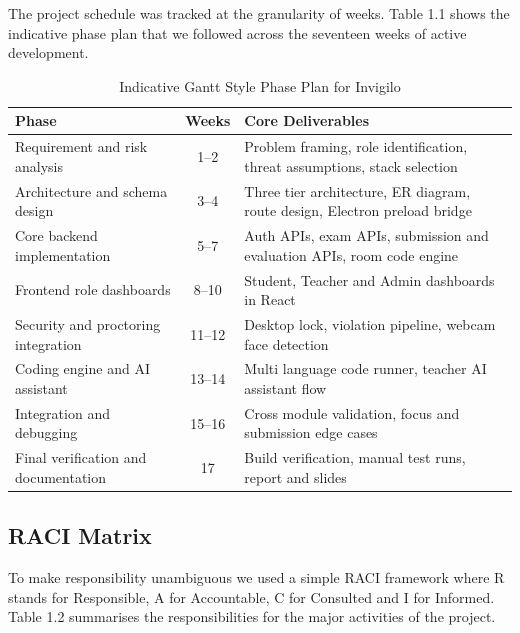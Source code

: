 \documentclass[12pt, a4paper]{report}
\begin{document}
\begin{justify}
  {\fontsize{12}{18}\selectfont
    The project schedule was tracked at the granularity of weeks. Table 1.1 shows the indicative phase plan that we followed across the seventeen weeks of active development.
  }
\end{justify}

\begin{table}[H]
  \caption{Indicative Gantt Style Phase Plan for Invigilo}
  \label{tab:1.1}
  \centering
  {\fontsize{11}{14}\selectfont
    \begin{tabular}{|p{1.2in}|c|p{3in}|}
      \hline
      \textbf{Phase} & \textbf{Weeks} & \textbf{Core Deliverables} \\
      \hline
      Requirement and risk analysis & 1--2 & Problem framing, role identification, threat assumptions, stack selection \\
      \hline
      Architecture and schema design & 3--4 & Three tier architecture, ER diagram, route design, Electron preload bridge \\
      \hline
      Core backend implementation & 5--7 & Auth APIs, exam APIs, submission and evaluation APIs, room code engine \\
      \hline
      Frontend role dashboards & 8--10 & Student, Teacher and Admin dashboards in React \\
      \hline
      Security and proctoring integration & 11--12 & Desktop lock, violation pipeline, webcam face detection \\
      \hline
      Coding engine and AI assistant & 13--14 & Multi language code runner, teacher AI assistant flow \\
      \hline
      Integration and debugging & 15--16 & Cross module validation, focus and submission edge cases \\
      \hline
      Final verification and documentation & 17 & Build verification, manual test runs, report and slides \\
      \hline
    \end{tabular}
  }
\end{table}

\subsection{RACI Matrix}

\begin{justify}
  {\fontsize{12}{18}\selectfont
    To make responsibility unambiguous we used a simple RACI framework where R stands for Responsible, A for Accountable, C for Consulted and I for Informed. Table 1.2 summarises the responsibilities for the major activities of the project.
  }
\end{justify}
\end{document}
